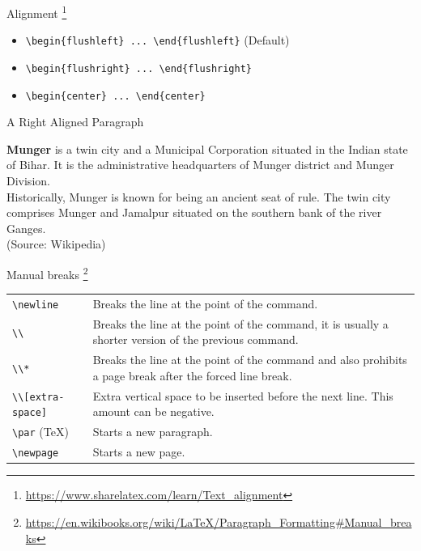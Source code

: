 \documentclass[10pt]{beamer}
\begin{document}
\begin{frame}[fragile]{Alignment
\footnote{\url{https://www.sharelatex.com/learn/Text_alignment}}}
\begin{itemize}
	\item \verb|\begin{flushleft} ... \end{flushleft}| (Default)
	\item \verb|\begin{flushright} ... \end{flushright}|
	\item \verb|\begin{center} ... \end{center}|
\end{itemize}
\pause
\begin{mybox}[]{A Right Aligned Paragraph}
\begin{flushright}
\textbf{Munger} is a twin city and a Municipal Corporation situated in the Indian state of Bihar. It is the administrative headquarters of Munger district and Munger Division.\\

\midskip Historically, Munger is known for being an ancient seat of rule. The twin city comprises Munger and Jamalpur situated on the southern bank of the river Ganges.\\
(Source: Wikipedia)
\end{flushright}
\end{mybox}
\end{frame}

\begin{frame}[fragile]{Manual breaks
\footnote{\url{https://en.wikibooks.org/wiki/LaTeX/Paragraph_Formatting\#Manual_breaks}}}
\begin{tabular}{l p{8cm}}
	\verb|\newline| 	    & Breaks the line at the point of the command.\\[1em]
	\verb|\\|	            & Breaks the line at the point of the command, it is usually a shorter version of the previous command.\\[1em]
	\verb|\\*|              & Breaks the line at the point of the command and also prohibits a page break after the forced line break. \\[1em]
	\verb|\\[extra-space]|  & Extra vertical space to be inserted before the next line. This amount can be negative.\\[1em]
	\verb|\par| (TeX)       & Starts a new paragraph. \\[1em]
	\verb|\newpage|         & Starts a new page.
\end{tabular}	
\end{frame}
\end{document}
